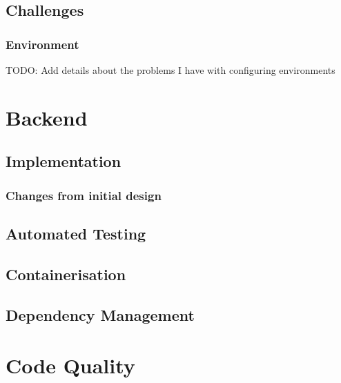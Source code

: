 \subsection{Challenges}
\subsubsection{Environment}
TODO: Add details about the problems I have with configuring environments

\section{Backend}
\subsection{Implementation}
\subsubsection{Changes from initial design}
\subsection{Automated Testing}
\subsection{Containerisation}
\subsection{Dependency Management}

\section{Code Quality} \label{sec:code-quality}
